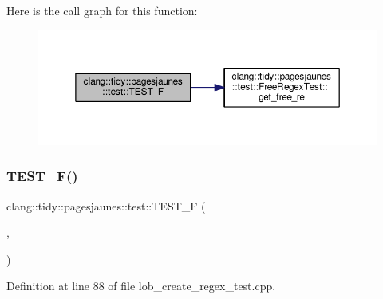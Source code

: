Here is the call graph for this function\+:
\nopagebreak
\begin{figure}[H]
\begin{center}
\leavevmode
\includegraphics[width=350pt]{namespaceclang_1_1tidy_1_1pagesjaunes_1_1test_a34c90a906bf999b3505c0b11192c6294_cgraph}
\end{center}
\end{figure}
\mbox{\label{namespaceclang_1_1tidy_1_1pagesjaunes_1_1test_aa0c1e4b3b995955cbb442e3301eaff74}} 
\subsubsection{\texorpdfstring{T\+E\+S\+T\+\_\+\+F()}{TEST\_F()}\hspace{0.1cm}{\footnotesize\ttfamily [24/57]}}
{\footnotesize\ttfamily clang\+::tidy\+::pagesjaunes\+::test\+::\+T\+E\+S\+T\+\_\+F (\begin{DoxyParamCaption}\item[{\hyperlink{classclang_1_1tidy_1_1pagesjaunes_1_1test_1_1_lob_create_regex_test}{Lob\+Create\+Regex\+Test}}]{,  }\item[{Regex\+Matching\+Weird\+Syntax}]{ }\end{DoxyParamCaption})}



Definition at line 88 of file lob\+\_\+create\+\_\+regex\+\_\+test.\+cpp.

